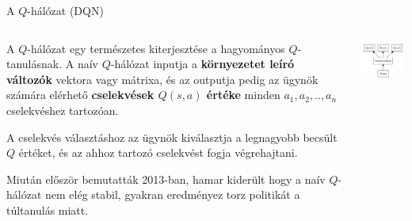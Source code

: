 \documentclass[english, aspectratio=169]{beamer}
\begin{document}
\begin{frame}{A $Q$-hálózat (DQN)}
\begin{columns}
\begin{column}{.6\textwidth}
A $Q$-hálózat egy természetes kiterjesztése a hagyományos $Q$-tanulásnak. A naív $Q$-hálózat inputja a \textbf{környezetet leíró változók} vektora vagy mátrixa, és az outputja pedig az ügynök számára elérhető \textbf{cselekvések $Q(s,a)$ értéke} minden $a_1,a_2,..,a_n$ cselekvéshez tartozóan. \par\smallskip
A cselekvés választáshoz az ügynök kiválasztja a legnagyobb becsült $Q$ értéket, és az ahhoz tartozó cselekvést fogja végrehajtani.\par\smallskip
Miután először bemutatták 2013-ban, hamar kiderült hogy a naív $Q$-hálózat nem elég stabil, gyakran eredményez torz politikát a túltanulás miatt. 
\end{column}
\begin{column}{.4\textwidth}
\begin{center}
\includegraphics[width=6cm, keepaspectratio]{graphs/ql_3.png}
\end{center}
\end{column}
\end{columns}
\end{frame}
\end{document}
